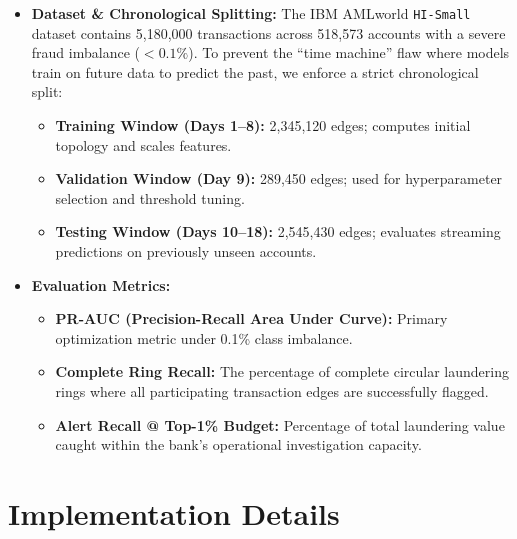 \documentclass[11pt, a4paper]{article}
\begin{document}
\begin{itemize}[noitemsep, topsep=2pt]
    where $\mathbf{W}_{\text{self}}$ and $\mathbf{W}_{\text{neigh}}$ are trainable parameter matrices, and $\gamma$ is a scaling hyperparameter.
    \item \textbf{Dataset \& Chronological Splitting:}
    The IBM AMLworld \texttt{HI-Small} dataset contains 5,180,000 transactions across 518,573 accounts with a severe fraud imbalance ($<0.1\%$). To prevent the ``time machine'' flaw where models train on future data to predict the past, we enforce a strict chronological split:
    \begin{itemize}[noitemsep]
        \item \textbf{Training Window (Days 1--8):} 2,345,120 edges; computes initial topology and scales features.
        \item \textbf{Validation Window (Day 9):} 289,450 edges; used for hyperparameter selection and threshold tuning.
        \item \textbf{Testing Window (Days 10--18):} 2,545,430 edges; evaluates streaming predictions on previously unseen accounts.
    \end{itemize}
    \item \textbf{Evaluation Metrics:}
    \begin{itemize}[noitemsep]
        \item \textbf{PR-AUC (Precision-Recall Area Under Curve):} Primary optimization metric under 0.1\% class imbalance.
        \item \textbf{Complete Ring Recall:} The percentage of complete circular laundering rings where all participating transaction edges are successfully flagged.
        \item \textbf{Alert Recall @ Top-1\% Budget:} Percentage of total laundering value caught within the bank's operational investigation capacity.
    \end{itemize}
\end{itemize}

\section{Implementation Details}
\end{document}
